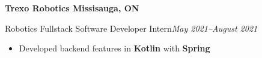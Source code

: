 \textbf{Trexo Robotics \hfill Missisauga, ON}

Robotics Fullstack Software Developer Intern\hfill \textit{May 2021--August 2021}
\begin{itemize}
    \item Developed backend features in \textbf{Kotlin} with \textbf{Spring}
\end{itemize}
